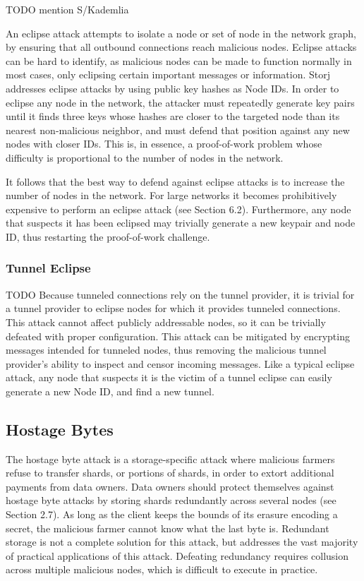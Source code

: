 \documentclass[a4paper,10pt]{article} \usepackage[utf8]{inputenc}
\newcommand{\todo}[1]{{\color{red} TODO #1 }}
\begin{document}
\todo{mention S/Kademlia

An eclipse attack attempts to isolate a node or set of node in the network
graph, by ensuring that all outbound connections reach malicious nodes. Eclipse
attacks can be hard to identify, as malicious nodes can be made to function
normally in most cases, only eclipsing certain important messages or
information. Storj addresses eclipse attacks by using public key hashes as Node
IDs. In order to eclipse any node in the network, the attacker must repeatedly
generate key pairs until it finds three keys whose hashes are closer to the
targeted node than its nearest non-malicious neighbor, and must defend that
position against any new nodes with closer IDs. This is, in essence, a
proof-of-work problem whose difficulty is proportional to the number of nodes in
the network.

It follows that the best way to defend against eclipse attacks is to increase
the number of nodes in the network. For large networks it becomes prohibitively
expensive to perform an eclipse attack (see Section 6.2). Furthermore, any node
that suspects it has been eclipsed may trivially generate a new keypair and node
ID, thus restarting the proof-of-work challenge. }

\subsubsection{Tunnel Eclipse}

\todo{ Because tunneled connections rely on the tunnel provider, it is trivial
for a tunnel provider to eclipse nodes for which it provides tunneled
connections. This attack cannot affect publicly addressable nodes, so it can be
trivially defeated with proper configuration. This attack can be mitigated by
encrypting messages intended for tunneled nodes, thus removing the malicious
tunnel provider's ability to inspect and censor incoming messages. Like a
typical eclipse attack, any node that suspects it is the victim of a tunnel
eclipse can easily generate a new Node ID, and find a new tunnel. }

\subsection{Hostage Bytes}

The hostage byte attack is a storage-specific attack where malicious farmers
refuse to transfer shards, or portions of shards, in order to extort additional
payments from data owners. Data owners should protect themselves against hostage
byte attacks by storing shards redundantly across several nodes (see Section
2.7). As long as the client keeps the bounds of its erasure encoding a secret,
the malicious farmer cannot know what the last byte is. Redundant storage is not
a complete solution for this attack, but addresses the vast majority of
practical applications of this attack. Defeating redundancy requires collusion
across multiple malicious nodes, which is difficult to execute in practice.
\end{document}
